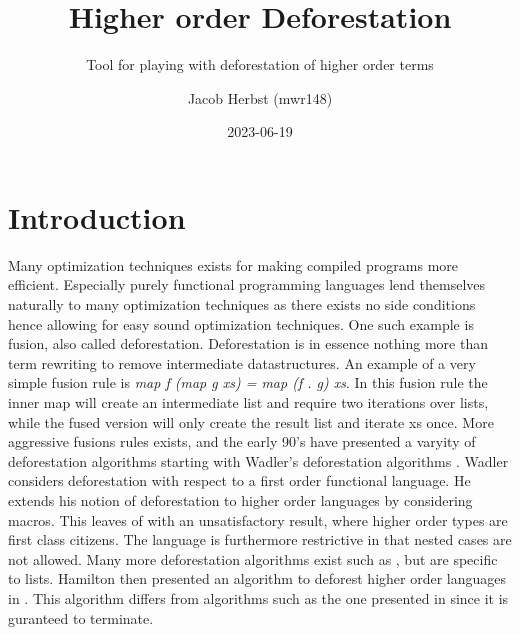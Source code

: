 \documentclass[a4paper, openany]{article}
\subtitle{Tool for playing with deforestation of higher order terms}
\author{Jacob Herbst (mwr148)}
\date{2023-06-19}
\title{\textbf{Higher order Deforestation}}
\begin{document}
\maketitle
{}

\begin{abstract}

\end{abstract}

\newpage

\setcounter{tocdepth}{2}
\tableofcontents

\newpage


\section{Introduction}
\label{sec:orgb4f1b5a}
\setcounter{page}{1}

Many optimization techniques exists for making compiled programs more efficient. Especially purely functional programming languages lend themselves naturally to many optimization techniques as there exists no side conditions hence allowing for easy sound optimization techniques. One such example is fusion, also called deforestation. Deforestation is in essence nothing more than term rewriting to remove intermediate datastructures. An example of a very simple fusion rule is
\emph{map f (map g xs) = map (f . g) xs}.
In this fusion rule the inner map will create an intermediate list and require two iterations over lists, while the fused version will only create the result list and iterate xs once.
More aggressive fusions rules exists, and the early 90's have presented a varyity of deforestation algorithms starting with Wadler's deforestation algorithms \cite{wadler}.
Wadler considers deforestation with respect to a first order functional language. He extends his notion of deforestation to higher order languages by considering macros. This leaves of with an unsatisfactory result, where higher order types are first class citizens. The language is furthermore restrictive in that nested cases are not allowed. Many more deforestation algorithms exist such as \cite{shortcut}, but are specific to lists. Hamilton then presented an algorithm to deforest higher order languages in \cite{hodeforest}. This algorithm differs from algorithms such as the one presented in \cite{other} since it is guranteed to terminate.
\end{document}
